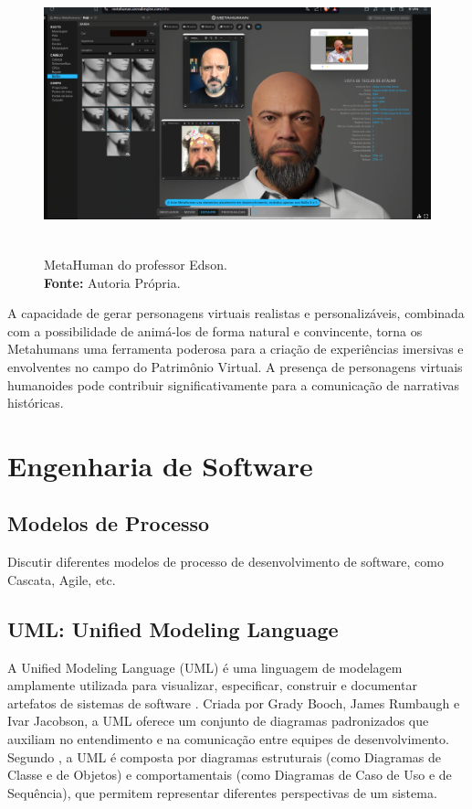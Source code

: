\begin{figure}[H]
    \centering
    \includegraphics[height=8cm, keepaspectratio]{img/Metahuman.png}
    \caption{MetaHuman do professor Edson. \\
        \textbf{Fonte:} Autoria Própria.}
    \label{fig:metahumanEdson}
\end{figure}

A capacidade de gerar personagens virtuais realistas e personalizáveis, combinada com a possibilidade de animá-los de forma natural e convincente, torna os Metahumans uma ferramenta poderosa para a criação de experiências imersivas e envolventes no campo do Patrimônio Virtual. A presença de personagens virtuais humanoides pode contribuir significativamente para a comunicação de narrativas históricas.

\section{Engenharia de Software}
\subsection{Modelos de Processo}
Discutir diferentes modelos de processo de desenvolvimento de software, como Cascata, Agile, etc.

\subsection{UML: Unified Modeling Language}
A Unified Modeling Language (UML) é uma linguagem de modelagem amplamente utilizada para visualizar, especificar, construir e documentar artefatos de sistemas de software \citep{Booch2005}. Criada por Grady Booch, James Rumbaugh e Ivar Jacobson, a UML oferece um conjunto de diagramas padronizados que auxiliam no entendimento e na comunicação entre equipes de desenvolvimento. Segundo \cite{Booch2005}, a UML é composta por diagramas estruturais (como Diagramas de Classe e de Objetos) e comportamentais (como Diagramas de Caso de Uso e de Sequência), que permitem representar diferentes perspectivas de um sistema.

